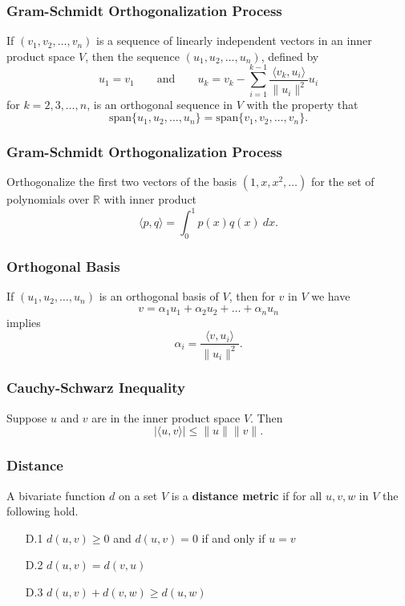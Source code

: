 \documentclass{beamer}
\begin{document}
\begin{frame}
\frametitle{Gram-Schmidt Orthogonalization Process}
\begin{Theorem}
If $(v_1, v_2, \ldots, v_n)$ is a sequence of linearly independent vectors in an inner product space $V$, then the sequence $(u_1, u_2,\ldots, u_n)$, defined by
$$
u_1 = v_1\qquad\text{and}\qquad u_k = v_k - \sum_{i = 1}^{k - 1} \frac{\langle v_k, u_i\rangle}{\| u_i\|^2} u_i
$$
for $k = 2, 3,\ldots, n$, is an orthogonal sequence in $V$ with the property that
$$
\text{span}\{u_1, u_2,\ldots, u_n\} = \text{span}\{v_1, v_2,\ldots, v_n\}.
$$
\end{Theorem}

\end{frame}

\begin{frame}[t]
\frametitle{Gram-Schmidt Orthogonalization Process}
\small
\begin{Example}
Orthogonalize the first two vectors of the basis $(1, x, x^2,\ldots)$ for the set of polynomials over $\mathbb{R}$ with inner product
$$
\langle p, q\rangle = \int_{0}^1 p(x)q(x)\ dx.
$$
\end{Example}


\end{frame}

\begin{frame}
\frametitle{Orthogonal Basis}
If $(u_1, u_2,\ldots, u_n)$ is an orthogonal basis of $V$, then for $v$ in $V$ we have
$$
v = \alpha_1 u_1 + \alpha_2 u_2 +\ldots + \alpha_n u_n
$$ 
implies
$$
\alpha_i = \frac{\langle v, u_i\rangle}{\|u_i\|^2}.
$$
\end{frame}

\begin{frame}
\frametitle{Cauchy-Schwarz Inequality}
\begin{Theorem}
Suppose $u$ and $v$ are in the inner product space $V$. Then
$$
|\langle u, v\rangle| \leq \|u\| \|v\|.
$$
\end{Theorem}
\end{frame}

\begin{frame}
\frametitle{Distance}
\begin{Definition}
A bivariate function $d$ on a set $V$ is a {\bf distance metric} if for all $u, v, w$ in $V$ the following hold.
\begin{enumerate}
\item[D.1] $d(u, v) \geq 0$ and $d(u, v) = 0$ if and only if $u = v$
\item[D.2] $d(u, v) = d(v, u)$
\item[D.3]  $d(u, v) + d(v, w) \geq d(u, w)$
\end{enumerate}
\end{Definition}
\end{frame}
\end{document}
